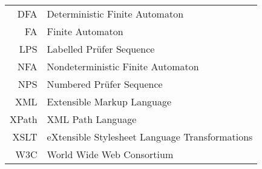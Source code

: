 \documentclass[czech,bachelor,unicode,oneside]{ctufit-thesis}
\begin{document}
% 
% 
% 
% 
% 
% 
% 
% 
% 

\tableofcontents %
\listoffigures %
\begingroup
\let\clearpage\relax
\listoftables %
\thectufitlistingscommand
\endgroup

\chapter{\thectufitabbreviationlabel}
	
\begin{tabular}{rl}
DFA & Deterministic Finite Automaton\\
FA & Finite Automaton\\
LPS & Labelled Prüfer Sequence\\
NFA & Nondeterministic Finite Automaton\\
NPS & Numbered Prüfer Sequence\\
XML & Extensible Markup Language\\
XPath & XML Path Language\\
XSLT & eXtensible Stylesheet Language Transformations\\
W3C & World Wide Web Consortium
\end{tabular}
\resumeTOCentries
\mainmatter\mainmatterinit %
\end{document}
